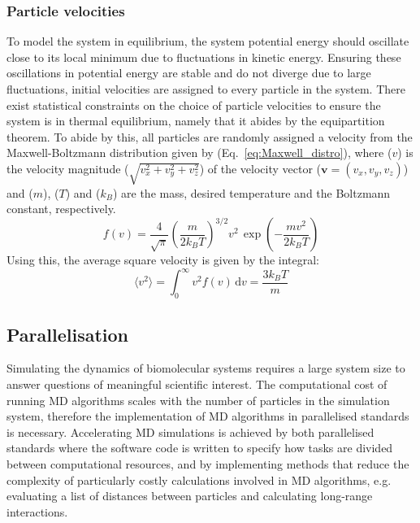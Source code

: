 \subsubsection{Particle velocities}
To model the system in equilibrium, the system potential energy should oscillate close to its local minimum due to fluctuations in kinetic energy. Ensuring these oscillations in potential energy are stable and do not diverge due to large fluctuations, initial velocities are assigned to every particle in the system. There exist statistical constraints on the choice of particle velocities to ensure the system is in thermal equilibrium, namely that it abides by the equipartition theorem. To abide by this, all particles are randomly assigned a velocity from the Maxwell-Boltzmann distribution given by (Eq.~\ref{eq:Maxwell_distro}), where ($v$) is the velocity magnitude ($\sqrt{v_x^2 + v_y^2 + v_z^2}$) of the velocity vector ($\mathbf{v} = (v_x, v_y, v_z)$) and ($m$), ($T$) and ($k_B$) are the mass, desired temperature and the Boltzmann constant, respectively. 
%
\begin{equation} \label{eq:Maxwell_distro}
    f(v) = \frac{4}{\sqrt{\pi}} \left( \frac{m}{2k_B T} \right)^{3/2} v^2 \, \exp{\left( - \frac{mv^2}{2k_B T}\right)}
\end{equation}
%
Using this, the average square velocity is given by the integral:
\begin{equation}
    \langle v^2 \rangle = \int_0^{\infty} v^2 f(v)\,\mathrm{d}v = \frac{3k_B T}{m}
\end{equation}
%
\subsection{Parallelisation}
Simulating the dynamics of biomolecular systems requires a large system size to answer questions of meaningful scientific interest. The computational cost of running MD algorithms scales with the number of particles in the simulation system, therefore the implementation of MD algorithms in parallelised standards is necessary. Accelerating MD simulations is achieved by both parallelised standards where the software code is written to specify how tasks are divided between computational resources, and by implementing methods that reduce the complexity of particularly costly calculations involved in MD algorithms, e.g. evaluating a list of distances between particles and calculating long-range interactions. 

